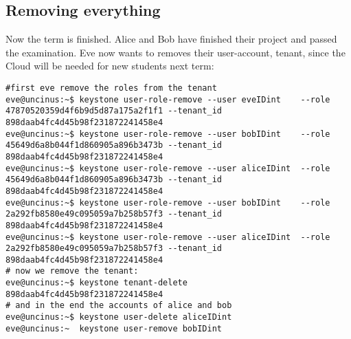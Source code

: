 \documentclass[a4paper,ngerman,bibtotocliststotoc]{scrartcl}
\begin{document}
\subsection{Removing everything}
\label{sec:removing-everything}
Now the term is finished. Alice and Bob have finished their project and
passed the examination. Eve now wants to removes their user-account,
tenant, since the Cloud will be needed for new students next term:
\begin{verbatim}
#first eve remove the roles from the tenant
eve@uncinus:~$ keystone user-role-remove --user eveIDint    --role 47870520359d4f6b9d5d87a175a2f1f1 --tenant_id 898daab4fc4d45b98f231872241458e4
eve@uncinus:~$ keystone user-role-remove --user bobIDint    --role 45649d6a8b044f1d860905a896b3473b --tenant_id 898daab4fc4d45b98f231872241458e4
eve@uncinus:~$ keystone user-role-remove --user aliceIDint  --role 45649d6a8b044f1d860905a896b3473b --tenant_id 898daab4fc4d45b98f231872241458e4
eve@uncinus:~$ keystone user-role-remove --user bobIDint    --role 2a292fb8580e49c095059a7b258b57f3 --tenant_id 898daab4fc4d45b98f231872241458e4
eve@uncinus:~$ keystone user-role-remove --user aliceIDint  --role 2a292fb8580e49c095059a7b258b57f3 --tenant_id 898daab4fc4d45b98f231872241458e4
# now we remove the tenant:
eve@uncinus:~$ keystone tenant-delete  898daab4fc4d45b98f231872241458e4
# and in the end the accounts of alice and bob
eve@uncinus:~$ keystone user-delete aliceIDint
eve@uncinus:~  keystone user-remove bobIDint
\end{verbatim}
\end{document}
